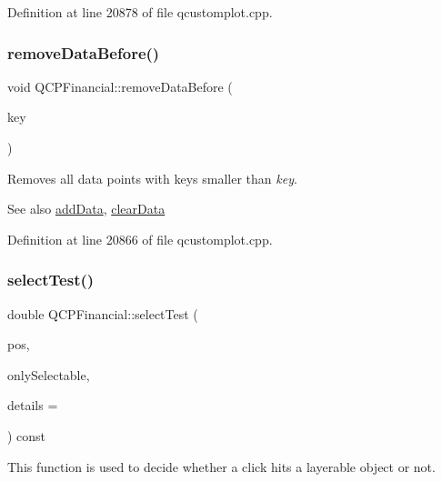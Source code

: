 Definition at line 20878 of file qcustomplot.\+cpp.

\mbox{\label{class_q_c_p_financial_a097c0383c7c1e9042ca7f93cb439d15a}} 
\subsubsection{\texorpdfstring{remove\+Data\+Before()}{removeDataBefore()}}
{\footnotesize\ttfamily void Q\+C\+P\+Financial\+::remove\+Data\+Before (\begin{DoxyParamCaption}\item[{double}]{key }\end{DoxyParamCaption})}

Removes all data points with keys smaller than {\itshape key}.

\begin{DoxySeeAlso}{See also}
\hyperlink{class_q_c_p_financial_a1a83396f97fcc68f2b7aa8d9782feffe}{add\+Data}, \hyperlink{class_q_c_p_financial_a11fd49928c33e55e27b7319c6927864a}{clear\+Data} 
\end{DoxySeeAlso}


Definition at line 20866 of file qcustomplot.\+cpp.

\mbox{\label{class_q_c_p_financial_a77bffad8f3fcbcccbef03ead1c538e3a}} 
\subsubsection{\texorpdfstring{select\+Test()}{selectTest()}}
{\footnotesize\ttfamily double Q\+C\+P\+Financial\+::select\+Test (\begin{DoxyParamCaption}\item[{const Q\+PointF \&}]{pos,  }\item[{bool}]{only\+Selectable,  }\item[{Q\+Variant $\ast$}]{details = {} }\end{DoxyParamCaption}) const\hspace{0.3cm}{\ttfamily [virtual]}}

This function is used to decide whether a click hits a layerable object or not.

